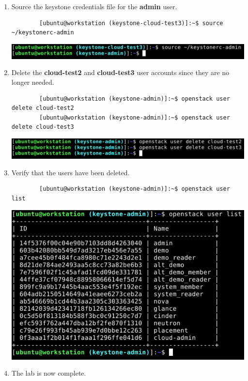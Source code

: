 \documentclass[letterpaper, 12pt]{article}
\begin{document}
\begin{enumerate}
    \item Source the keystone credentials file for the \textbf{admin} user.
    \begin{lstlisting}
        [ubuntu@workstation (keystone-cloud-test3)]:~$ source ~/keystonerc-admin
    \end{lstlisting}

    \begin{center}
        \includegraphics[width=\linewidth]{images/part4/step22.png}
    \end{center}

    \item Delete the \textbf{cloud-test2} and \textbf{cloud-test3} user accounts since they are no longer needed.
    \begin{lstlisting}
        [ubuntu@workstation (keystone-admin)]:~$ openstack user delete cloud-test2
        [ubuntu@workstation (keystone-admin)]:~$ openstack user delete cloud-test3
    \end{lstlisting}

    \begin{center}
        \includegraphics[width=\linewidth]{images/part4/step23.png}
    \end{center}

    \item Verify that the users have been deleted.
    \begin{lstlisting}
        [ubuntu@workstation (keystone-admin)]:~$ openstack user list
    \end{lstlisting}

    \begin{center}
        \includegraphics[width=\linewidth]{images/part4/step24.png}
    \end{center}

    \item The lab is now complete.
\end{enumerate}
\end{document}
